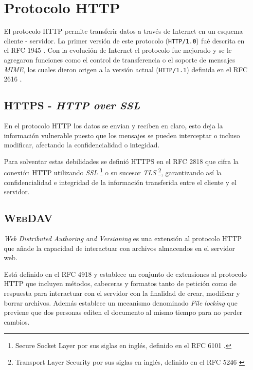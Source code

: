 
\section {Protocolo \textsc{HTTP}}

El protocolo \textsc{HTTP} permite transferir datos a trav\'{e}s de Internet en un esquema cliente - servidor. La primer versi\'{o}n de este protocolo (\texttt{HTTP/1.0}) fu\'{e} descrita en el \textsc{RFC} 1945 \cite{_rfc_????-1}. Con la evoluci\'{o}n de Internet el protocolo fue mejorado y se le agregaron funciones como el control de transferencia o el soporte de mensajes \textit{MIME}, los cuales dieron origen a la versi\'{o}n actual (\texttt{HTTP/1.1}) definida en el RFC 2616 \cite{_rfc_????}.

  \subsection {\textsc{HTTPS} - \textit{HTTP over SSL}}

En el protocolo \textsc{HTTP} los datos se envian y reciben en claro, esto deja la informaci\'{o}n vulnerable puesto que los mensajes se pueden interceptar o incluso modificar, afectando la confidencialidad o integidad.

Para solventar estas debilidades se defini\'{o} \textsc{HTTPS} en el \textsc{RFC} 2818 \cite{_rfc_????-6} que cifra la conexi\'{o}n \textsc{HTTP} utilizando \textit{SSL} \footnote{Secure Socket Layer por sus siglas en ingl\'{e}s, definido en el \textsc{RFC} 6101 \cite{_rfc_????-4}.} o su sucesor \textit{TLS} \footnote{Transport Layer Security por sus siglas en ingl\'{e}s, definido en el \textsc{RFC} 5246 \cite{_rfc_????-3}}, garantizando as\'{i} la confidencialidad e integridad de la informaci\'{o}n transferida entre el cliente y el servidor.

  \subsection {\textsc{WebDAV}}

\textit{Web Distributed Authoring and Versioning} es una extensi\'{o}n al protocolo \textsc{HTTP} que a\~{n}ade la capacidad de interactuar con archivos almacendos en el servidor web.

Est\'{a} definido en el \textsc{RFC} 4918 \cite{_rfc_????-2} y establece un conjunto de extensiones al protocolo \textsc{HTTP} que incluyen m\'{e}todos, cabeceras y formatos tanto de petici\'{o}n como de respuesta para interactuar con el servidor con la finalidad de crear, modificar y borrar archivos. Adem\'{a}s establece un mecanismo denominado \textit{File locking} que previene que dos personas editen el documento al mismo tiempo para no perder cambios.

